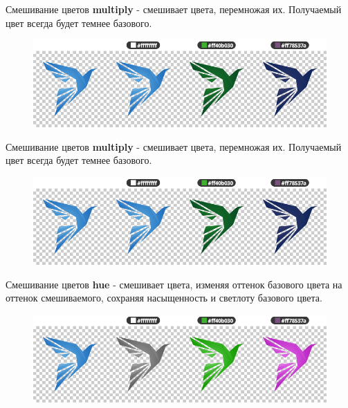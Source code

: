\documentclass[aspectration=1610,t]{beamer}
\begin{document}
\begin{frame}[fragile]{Смешивание цветов}
    {\bf multiply} - смешивает цвета, перемножая их. Получаемый цвет всегда будет темнее базового.
    \begin{figure}[htp]
        \centering
        \includegraphics[scale=0.40]{res/multiply}
    \end{figure}
\end{frame}

\begin{frame}[fragile]{Смешивание цветов}
    {\bf multiply} - смешивает цвета, перемножая их. Получаемый цвет всегда будет темнее базового.
    \begin{figure}[htp]
        \centering
        \includegraphics[scale=0.40]{res/multiply}
    \end{figure}
\end{frame}

\begin{frame}[fragile]{Смешивание цветов}
    {\bf hue} - смешивает цвета, изменяя оттенок базового цвета на оттенок смешиваемого, 
    сохраняя насыщенность и светлоту базового цвета.
    \begin{figure}[htp]
        \centering
        \includegraphics[scale=0.40]{res/hue}
    \end{figure}
\end{frame}
\end{document}
